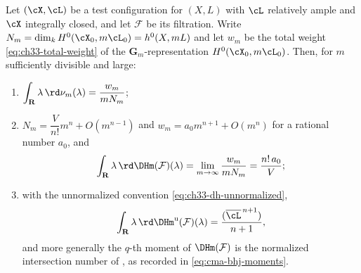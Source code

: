 \begin{theorem}
\label{thm:ch33-dh-weight-count}
Let $(\cX,\cL)$ be a test configuration for $(X,L)$ with $\cL$
relatively ample and $\cX$ integrally closed, and let
$\mathcal F$ be its filtration.  Write
$N_m=\dim_kH^0(\cX_0,m\cL_0)=h^0(X,mL)$ and let $w_m$ be the total
weight \eqref{eq:ch33-total-weight} of the $\mathbf G_m$-representation
$H^0(\cX_0,m\cL_0)$.  Then, for $m$ sufficiently divisible and large:
\begin{enumerate}
\item $\displaystyle
 \int_{\mathbf R}\lambda\,\rd\nu_m(\lambda)=\frac{w_m}{mN_m}$;
\item $N_m=\dfrac{V}{n!}m^n+O(m^{n-1})$ and
 $w_m=a_0m^{n+1}+O(m^n)$ for a rational number $a_0$, and
\begin{equation}
\label{eq:ch33-first-moment-limit}
 \int_{\mathbf R}\lambda\,\rd\DHm(\mathcal F)(\lambda)
 =\lim_{m\to\infty}\frac{w_m}{mN_m}
 =\frac{n!\,a_0}{V};
\end{equation}
\item with the unnormalized convention
 \eqref{eq:ch33-dh-unnormalized},
\begin{equation}
\label{eq:ch33-first-moment-intersection}
 \int_{\mathbf R}\lambda\,\rd\DHm^{\mathrm u}(\mathcal F)(\lambda)
 =\frac{(\overline\cL^{\,n+1})}{n+1},
\end{equation}
 and more generally the $q$-th moment of $\DHm(\mathcal F)$ is the
 normalized intersection number of
 \cite[Corollary~3.4]{BHJ17}, as recorded in
 \eqref{eq:cma-bhj-moments}.
\end{enumerate}
\end{theorem}

